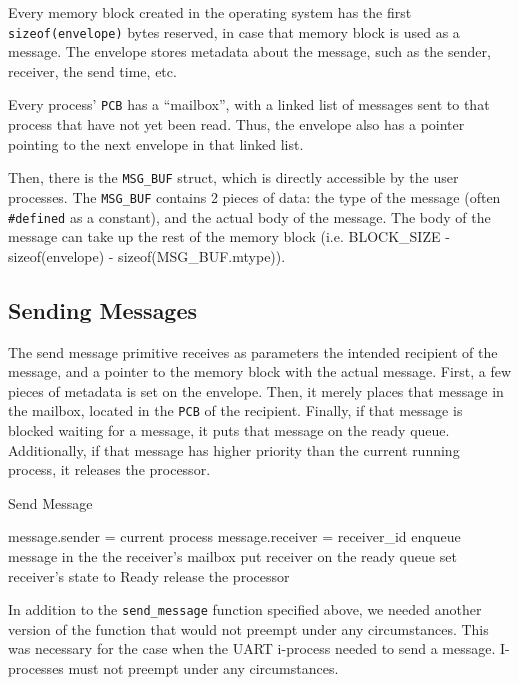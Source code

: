 \documentclass[12pt]{report}
\begin{document}
Every memory block created in the operating system has the first \texttt{sizeof(envelope)} bytes reserved, in case that memory block is used as a message. The envelope stores metadata about the message, such as the sender, receiver, the send time, etc. 

Every process' \texttt{PCB} has a ``mailbox'', with a linked list of messages sent to that process that have not yet been read. Thus, the envelope also has a pointer pointing to the next envelope in that linked list.

Then, there is the \texttt{MSG_BUF} struct, which is directly accessible by the user processes. The \texttt{MSG_BUF} contains 2 pieces of data: the type of the message (often \texttt{\#defined} as a constant), and the actual body of the message. The body of the message can take up the rest of the memory block (i.e. BLOCK_SIZE - sizeof(envelope) - sizeof(MSG_BUF.mtype)). 


\subsection{Sending Messages}

The send message primitive receives as parameters the intended recipient of the message, and a pointer to the memory block with the actual message. First, a few pieces of metadata is set on the envelope. Then, it merely places that message in the mailbox, located in the \texttt{PCB} of the recipient. Finally, if that message is blocked waiting for a message, it puts that message on the ready queue. Additionally, if that message has higher priority than the current running process, it releases the processor.

\begin{algorithm}[H]
	\caption{Send Message}
	\begin{algorithmic}[1]
			\State message.sender = current process
			\State message.receiver = receiver_id
			\State enqueue message in the the receiver's mailbox
				\State put receiver on the ready queue
				\State set receiver's state to Ready
					\State release the processor
				\EndIf
			\EndIf
		\EndFunction
	\end{algorithmic}
\end{algorithm}

In addition to the \texttt{send_message} function specified above, we needed another version of the function that would not preempt under any circumstances. This was necessary for the case when the UART i-process needed to send a message. I-processes must not preempt under any circumstances.
\end{document}
